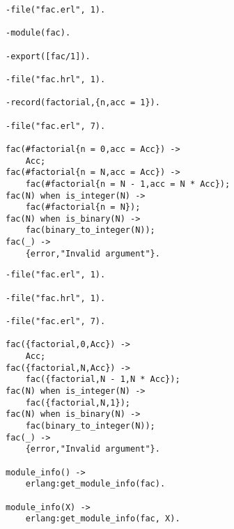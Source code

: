 \begin{lstlisting}[style=erlang, caption=Moduł fac po pierwszym przetworzeniu, label=facP]
-file("fac.erl", 1).

-module(fac).

-export([fac/1]).

-file("fac.hrl", 1).

-record(factorial,{n,acc = 1}).

-file("fac.erl", 7).

fac(#factorial{n = 0,acc = Acc}) ->
    Acc;
fac(#factorial{n = N,acc = Acc}) ->
    fac(#factorial{n = N - 1,acc = N * Acc});
fac(N) when is_integer(N) ->
    fac(#factorial{n = N});
fac(N) when is_binary(N) ->
    fac(binary_to_integer(N));
fac(_) ->
    {error,"Invalid argument"}.
\end{lstlisting}

\begin{lstlisting}[style=erlang, caption=Moduł fac po drugim przetworzeniu, label=facE]
-file("fac.erl", 1).

-file("fac.hrl", 1).

-file("fac.erl", 7).

fac({factorial,0,Acc}) ->
    Acc;
fac({factorial,N,Acc}) ->
    fac({factorial,N - 1,N * Acc});
fac(N) when is_integer(N) ->
    fac({factorial,N,1});
fac(N) when is_binary(N) ->
    fac(binary_to_integer(N));
fac(_) ->
    {error,"Invalid argument"}.

module_info() ->
    erlang:get_module_info(fac).

module_info(X) ->
    erlang:get_module_info(fac, X).
\end{lstlisting}
